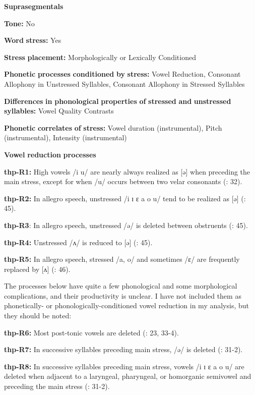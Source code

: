 \textbf{Suprasegmentals}

\textbf{Tone:} No

\textbf{Word} \textbf{stress:} Yes

\textbf{Stress} \textbf{placement:} Morphologically or Lexically Conditioned

\textbf{Phonetic} \textbf{processes} \textbf{conditioned} \textbf{by} \textbf{stress:} Vowel Reduction, Consonant Allophony in Unstressed Syllables, Consonant Allophony in Stressed Syllables

\textbf{Differences} \textbf{in} \textbf{phonological} \textbf{properties} \textbf{of} \textbf{stressed} \textbf{and} \textbf{unstressed} \textbf{syllables:} Vowel Quality Contrasts

\textbf{Phonetic} \textbf{correlates} \textbf{of} \textbf{stress:} Vowel duration (instrumental), Pitch (instrumental), Intensity (instrumental)

\textbf{Vowel} \textbf{reduction} \textbf{processes}

\textbf{thp-R1:} High vowels /i u/ are nearly always realized as [ə] when preceding the main stress, except for when /u/ occurs between two velar consonants (\citealt{ThompsonThompson1992}: 32).

\textbf{thp-R2:} In allegro speech, unstressed /i ɪ ɛ a o u/ tend to be realized as [ə] (\citealt{ThompsonThompson1992}: 45).

\textbf{thp-R3}: In allegro speech, unstressed /ə/ is deleted between obstruents (\citealt{ThompsonThompson1992}: 45).

\textbf{thp-R4:} Unstressed /ʌ/ is reduced to [ə] (\citealt{ThompsonThompson1992}: 45).

\textbf{thp-R5:} In allegro speech, stressed /a, o/ and sometimes /ɛ/ are frequently replaced by [ʌ] (\citealt{ThompsonThompson1992}: 46).

The processes below have quite a few phonological and some morphological complications, and their productivity is unclear. I have not included them as phonetically- or phonologically-conditioned vowel reduction in my analysis, but they should be noted:

\textbf{thp-R6:} Most post-tonic vowels are deleted (\citealt{ThompsonThompson1992}: 23, 33-4).

\textbf{thp-R7:} In successive syllables preceding main stress, /ə/ is deleted (\citealt{ThompsonThompson1992}: 31-2).

\textbf{thp-R8:} In successive syllables preceding main stress, vowels /i ɪ ɛ a o u/ are deleted when adjacent to a laryngeal, pharyngeal, or homorganic semivowel and preceding the main stress (\citealt{ThompsonThompson1992}: 31-2).

